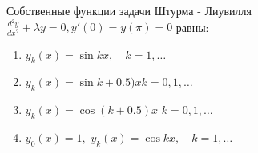 Собственные функции задачи Штурма - Лиувилля \(\frac{d^2y}{dx^2}+\lambda y =0, y'\left(0\right)=y\left(\pi \right) =0\) равны:

\begin{enumerate}[label=\arabic*)]
    \item \(y_k\left(x\right)=\sin kx,\quad k=1,\dots\)
    \item \(y_k\left(x\right)=\sin k+0.5)x k=0,1,\dots\)
    \item \(y_k\left(x\right)=\cos (k+0.5)x\) \(k=0,1,\dots\)
    \item \(y_0\left(x\right)=1,\) \(y_k\left(x\right)=\cos kx,\quad k=1,\dots\)
\end{enumerate}

